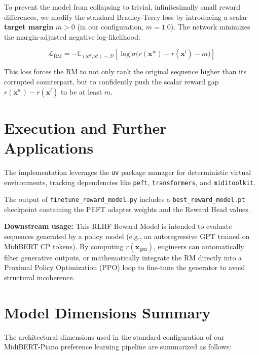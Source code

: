\documentclass[11pt,a4paper]{article}
\begin{document}
To prevent the model from collapsing to trivial, infinitesimally small reward differences, we modify the standard Bradley-Terry loss by introducing a scalar \textbf{target margin} $m > 0$ (in our configuration, $m=1.0$). The network minimizes the margin-adjusted negative log-likelihood:

\begin{equation}
    \mathcal{L}_{\text{RM}} = - \mathbb{E}_{(\mathbf{x}^w, \mathbf{x}^l) \sim \mathcal{D}} \left[ \log \sigma\bigl(r(\mathbf{x}^w) - r(\mathbf{x}^l) - m\bigr) \right]
\end{equation}

This loss forces the RM to not only rank the original sequence higher than its corrupted counterpart, but to confidently push the scalar reward gap $r(\mathbf{x}^w) - r(\mathbf{x}^l)$ to be at least $m$.

\section{Execution and Further Applications}

The implementation leverages the \texttt{uv} package manager for deterministic virtual environments, tracking dependencies like \texttt{peft}, \texttt{transformers}, and \texttt{miditoolkit}.

The output of \texttt{finetune\_reward\_model.py} includes a \texttt{best\_reward\_model.pt} checkpoint containing the PEFT adapter weights and the Reward Head values. 

\textbf{Downstream usage:} This RLHF Reward Model is intended to evaluate sequences generated by a policy model (e.g., an autoregressive GPT trained on MidiBERT CP tokens). By computing $r(\mathbf{x}_{\text{gen}})$, engineers can automatically filter generative outputs, or mathematically integrate the RM directly into a Proximal Policy Optimization (PPO) loop to fine-tune the generator to avoid structural incoherence.

\section{Model Dimensions Summary}
\label{sec:dimensions}

The architectural dimensions used in the standard configuration of our MidiBERT-Piano preference learning pipeline are summarized as follows:
\end{document}
